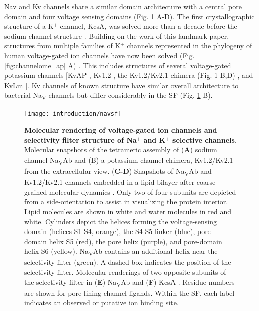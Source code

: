 \begin{refsection}
Nav and Kv channels share a similar domain architecture with a central pore domain and four voltage sensing domains (Fig. \ref{fig:nav_sf} A-D). The first crystallographic structure of a K$^+$ channel, KcsA, was solved more than a decade before the sodium channel structure \cite{Doyle:1998wq}. Building on the work of this landmark paper, structures from multiple families of K$^+$ channels represented in the phylogeny of human voltage-gated ion channels have now been solved (Fig. \ref{fig:channelome_ap} A) \cite{Tian:2013er,Kuang:2015jn}. This includes structures of several voltage-gated potassium channels [KvAP \cite{Jiang:2003vh}, Kv1.2 \cite{Long:2005do}, the Kv1.2/Kv2.1 chimera (Fig. \ref{fig:nav_sf} B,D) \cite{Long:2007cv}, and KvLm \cite{Santos:2012gg}]. Kv channels of known structure have similar overall architecture to bacterial Na\textsubscript{V} channels but differ considerably in the SF (Fig. \ref{fig:nav_sf} B).

\begin{figure}[hp]
\centering
\texttt{[image: introduction/navsf]}
\caption[Molecular rendering of voltage-gated ion channels and selectivity filter structure of Na$^+$ and K$^+$ selective channels]{\textbf{Molecular rendering of voltage-gated ion channels and selectivity filter structure of Na$^+$ and K$^+$ selective channels}. Molecular snapshots of the tetrameric assembly of (\textbf{A}) sodium channel Na\textsubscript{V}Ab \cite{Payandeh:2012ib} and (B) a potassium channel chimera, Kv1.2/Kv2.1 \cite{Long:2007cv} from the extracellular view. (\textbf{C-D}) Snapshots of Na\textsubscript{V}Ab and Kv1.2/Kv2.1 channels embedded in a lipid bilayer after coarse-grained molecular dynamics \cite{Stansfeld:2015tb}. Only two of four subunits are depicted from a side-orientation to assist in visualizing the protein interior. Lipid molecules are shown in white and water molecules in red and white. Cylinders depict the helices forming the voltage-sensing domain (helices S1-S4, orange), the S4-S5 linker (blue), pore- domain helix S5 (red), the pore helix (purple), and pore-domain helix S6 (yellow). Na\textsubscript{V}Ab contains an additional helix near the selectivity filter (green). A dashed box indicates the position of the selectivity filter. Molecular renderings of two opposite subunits of the selectivity filter in (\textbf{E}) Na\textsubscript{V}Ab \cite{Payandeh:2012ib} and (\textbf{F}) KcsA \cite{Zhou:2001vo}. Residue numbers are shown for pore-lining channel ligands. Within the SF, each label indicates an observed or putative ion binding site.}
\label{fig:nav_sf}
\end{figure}


\end{refsection}
